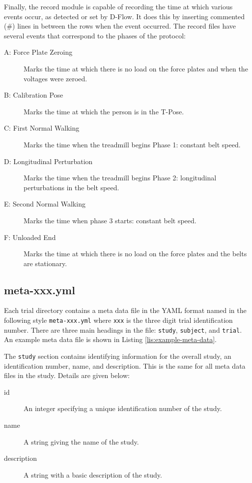 \documentclass[10pt,a4paper,twocolumn]{article}
\begin{document}
Finally, the record module is capable of recording the time at which various
events occur, as detected or set by D-Flow. It does this by inserting commented
(\#) lines in between the rows when the event occurred. The record files have
several events that correspond to the phases of the protocol:

\begin{description}
  \item[A: Force Plate Zeroing] Marks the time at which there is no load on the
    force plates and when the voltages were zeroed.
  \item[B: Calibration Pose] Marks the time at which the person is in the
    T-Pose.
  \item[C: First Normal Walking] Marks the time when the treadmill begins Phase
    1: constant belt speed.
  \item[D: Longitudinal Perturbation] Marks the time when the treadmill begins
    Phase 2: longitudinal perturbations in the belt speed.
  \item[E: Second Normal Walking] Marks the time when phase 3 starts: constant
    belt speed.
  \item[F: Unloaded End] Marks the time at which there is no load on the force
    plates and the belts are stationary.
\end{description}

\subsection*{meta-xxx.yml}

Each trial directory contains a meta data file in the YAML format named in the
following style \verb|meta-xxx.yml| where \verb|xxx| is the three digit trial
identification number. There are three main headings in the file: \verb+study+,
\verb+subject+, and \verb+trial+. An example meta data file is shown in Listing
\ref{lis:example-meta-data}.

The \verb+study+ section contains identifying information for the overall
study, an identification number, name, and description. This is the same for
all meta data files in the study. Details are given below:

\begin{description}
  \item[id] An integer specifying a unique identification number of the study.
  \item[name] A string giving the name of the study.
  \item[description] A string with a basic description of the study.
\end{description}
\end{document}
